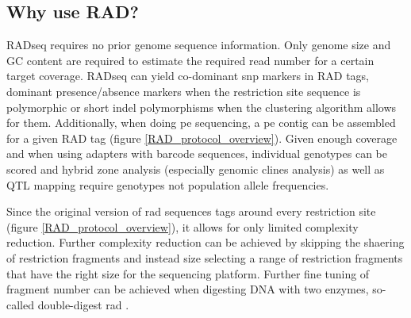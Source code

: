 \documentclass[a4paper,12pt,times,print,index, custombib]{PhDThesisPSnPDF}\usepackage[]{graphicx}\usepackage[]{color}
\begin{document}
\subsection{Why use RAD?}
RADseq requires no prior genome sequence information. Only genome size and GC content are required to estimate the required read number for a certain target coverage. 
RADseq can yield co-dominant \gls{snp} markers in \glspl{RAD tag}, dominant presence/absence markers when the restriction site sequence is polymorphic or short indel polymorphisms when the clustering algorithm allows for them. Additionally, when doing \gls{pe} sequencing, a \gls{pe} contig can be assembled for a given \gls{RAD tag} (figure \ref{RAD_protocol_overview}).
Given enough coverage and when using adapters with barcode sequences, individual genotypes can be scored and hybrid zone analysis (especially genomic clines analysis) as well as QTL mapping require genotypes not population allele frequencies. 

Since the original version of \gls{rad} sequences tags around every restriction site (figure \ref{RAD_protocol_overview}), it allows for only limited complexity reduction. Further complexity reduction can be achieved by skipping the shaering of restriction fragments and instead size selecting a range of restriction fragments that have the right size for the sequencing platform. Further fine tuning of fragment number can be achieved when digesting DNA with two enzymes, so-called double-digest \gls{rad} \citep{Peterson2012}.

\end{document}
